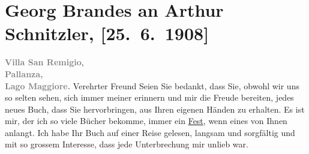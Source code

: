 

         \renewcommand{\erwaehnteOrte}{Orte: Pallanza, Seis am Schlern, Villa San Remigio, Wien, Österreich}
         \renewcommand{\erwaehnteWerke}{Werke: Der Weg ins Freie. Roman}
               \section[Georg Brandes an Arthur Schnitzler, {[}25. 6. 1908{]}]{ Georg Brandes an Arthur Schnitzler, {[}25. 6. 1908{]}}\nopagebreak{}\rehead{ }\begin{ledgroupsized}[t]{13cm}\normalsize\beginnumbering \toendnotes[C]{\smallbreak\pagebreak[2]} 
\toendnotes[C]{\smallbreak}\pstart
           \noindent{}{\pb}\textcolor{gray}{\textbf{Villa San Remigio}}, {\\}\textcolor{gray}{\textbf{Pallanza,}}{\\}\textcolor{gray}{\textbf{Lago Maggiore.}}\pend
           \pstart{}Verehrter Freund\pend\pstart
           Seien Sie bedankt, dass Sie, obwohl wir uns so selten sehen, sich immer meiner
                    erinnern und mir die Freude bereiten, jedes neues Buch, dass Sie hervorbringen,
                    aus Ihren eigenen Händen zu erhalten. Es ist mir, der ich so viele Bücher
                    bekomme, immer ein \uline{Fest}, wenn eines von Ihnen
                    anlangt.\pend
           \pstart
           Ich habe Ihr Buch auf einer
                    Reise gelesen, langsam und sorgfältig und mit so grossem Interesse, dass jede
                    Unterbrechung mir unlieb war.\pend

\end{ledgroupsized}
